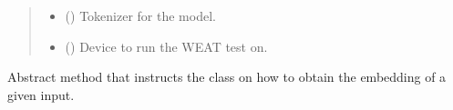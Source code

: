 \documentclass[letterpaper,10pt,english]{sphinxmanual}
\begin{document}
\begin{fulllineitems}
\begin{fulllineitems}
\begin{quote}
\begin{description}
\begin{itemize}
\item {} 
\sphinxAtStartPar
{} () \textendash{} Tokenizer for the model.

\item {} 
\sphinxAtStartPar
{} () \textendash{} Device to run the WEAT test on.

\end{itemize}

\end{description}\end{quote}

\end{fulllineitems}



\begin{fulllineitems}

\pysigstartsignatures
\pysiglinewithargsret
{}
{}
{}
\pysigstopsignatures
\sphinxAtStartPar
Abstract method that instructs the class on how to obtain the embedding of a given input.

\end{fulllineitems}



\begin{fulllineitems}


\end{fulllineitems}
\end{fulllineitems}
\end{document}
